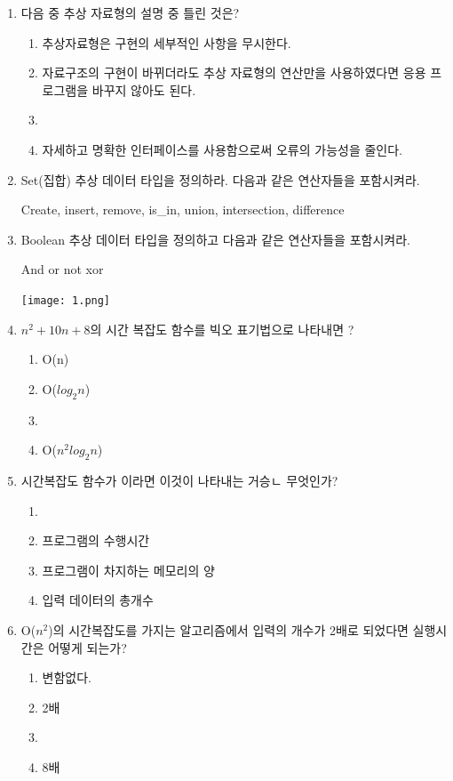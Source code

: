 \documentclass[11pt,a4paper]{article}
\begin{document}
\noindent
\begin{enumerate}
	

\item {\large\ttfamily 다음 중 추상 자료형의 설명 중 틀린 것은?}
	\begin{enumerate}
	\item 추상자료형은 구현의 세부적인 사항을 무시한다.
	\item 자료구조의 구현이 바뀌더라도 추상 자료형의 연산만을 사용하였다면 응용 프로그램을 바꾸지 않아도 된다.
	\item {}
	\item 자세하고 명확한 인터페이스를 사용함으로써 오류의 가능성을 줄인다.
	\end{enumerate}
	
\item Set(집합) 추상 데이터 타입을 정의하라. 다음과 같은 연산자들을 포함시켜라.

{\ttfamily Create, insert, remove, is\_in, union, intersection, difference}

\item Boolean 추상 데이터 타입을 정의하고 다음과 같은 연산자들을 포함시켜라.

And or not xor

\lstset{language=C++, tabsize=4, frame=single, showstringspaces=false, breaklines=true, columns=flexible, basicstyle=\ttfamily\small}
	
\texttt{[image: 1.png]}
	
	
\item $n^2+10n+8$의 시간 복잡도 함수를 빅오 표기법으로 나타내면 ?
	\begin{enumerate}
		\item O(n)	
		\item O($log_2 n$)
		\item {}
		\item O($n^2log_2n$)
	\end{enumerate}
	
\item 시간복잡도 함수가 이라면 이것이 나타내는 거승ㄴ 무엇인가?
	\begin{enumerate}
		\item {}
		\item 프로그램의 수행시간
		\item 프로그램이 차지하는 메모리의 양
		\item 입력 데이터의 총개수
	\end{enumerate}
\item O($n^2$)의 시간복잡도를 가지는 알고리즘에서 입력의 개수가 2배로 되었다면 실행시간은 어떻게 되는가?
\begin{enumerate}
	\item 변함없다.
	\item 2배
	\item {}
	\item 8배
\end{enumerate}


\end{enumerate}
\end{document}
